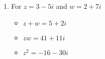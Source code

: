 \begin{enumerate}
\begin{multicols}{3}
\begin{itemize}
\end{itemize}

\end{multicols}

\begin{multicols}{3}

\begin{itemize}

\item $\frac{1}{z} = -\frac{1}{4} \,i$

\item $\frac{z}{w} = -1+i$

\item $\frac{w}{z} = -\frac{1}{2} - \frac{1}{2} \,i$

\end{itemize}

\end{multicols}

\begin{multicols}{3}

\begin{itemize}

\item $\overline{z} = -4i$

\item $z\overline{z} = 16$

\item $(\overline{z})^2 = -16$

\end{itemize}

\end{multicols}

\item  For  $z = 3-5i$ and $w = 2+7i$

\begin{multicols}{3}

\begin{itemize}

\item $z+w = 5+2i$

\item $zw = 41+11i$

\item $z^2 = -16-30i$

\end{itemize}

\end{multicols}

\begin{multicols}{3}

\begin{itemize}


\end{itemize}
\end{multicols}
\end{enumerate}
